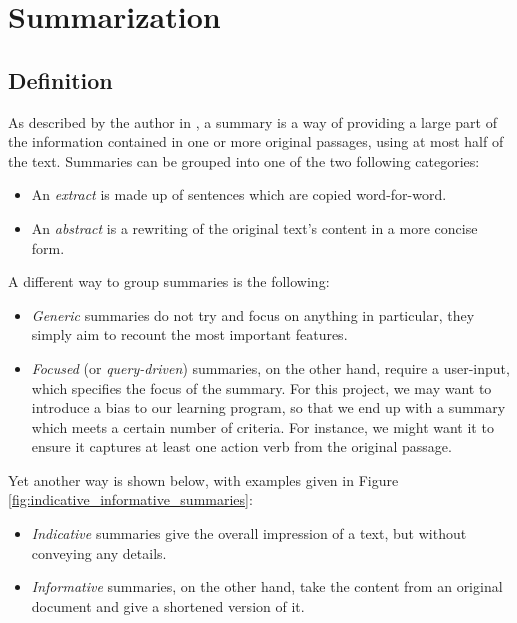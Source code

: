 \label{chapter:background}

\section{Summarization}

\subsection{Definition} \label{sec:definition}

As described by the author in \cite{lloret_text_2008}, a summary is a way of providing a large part of the information contained in one or more original passages, using at most half of the text. Summaries can be grouped into one of the two following categories:

\begin{itemize}[nolistsep]
\item An \textit{extract} is made up of sentences which are copied word-for-word.
\item An \textit{abstract} is a rewriting of the original text's content in a more concise form.
\end{itemize}

\mbox{}

A different way to group summaries is the following:

\begin{itemize}[nolistsep]
\item \textit{Generic} summaries do not try and focus on anything in particular, they simply aim to recount the most important features.
\item \textit{Focused} (or \textit{query-driven}) summaries, on the other hand, require a user-input, which specifies the focus of the summary. For this project, we may want to introduce a bias to our learning program, so that we end up with a summary which meets a certain number of criteria. For instance, we might want it to ensure it captures at least one action verb from the original passage.
\end{itemize}

\mbox{}

Yet another way \cite{radev_introduction_2002} is shown below, with examples given in Figure \ref{fig:indicative_informative_summaries}:

\begin{itemize}[nolistsep]
\item \textit{Indicative} summaries give the overall impression of a text, but without conveying any details.
\item \textit{Informative} summaries, on the other hand, take the content from an original document and give a shortened version of it.
\end{itemize}

